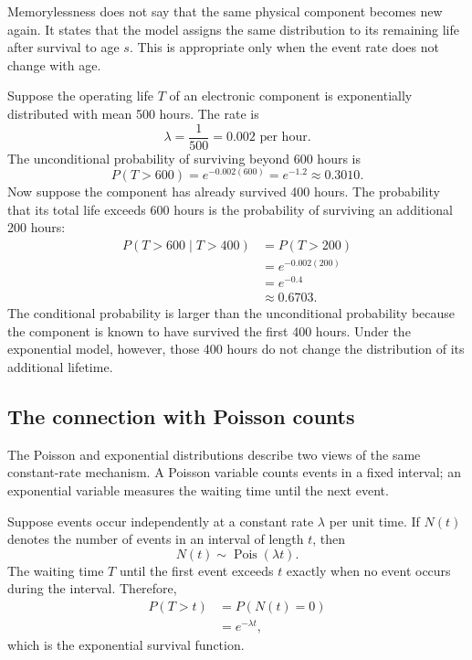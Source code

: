 Memorylessness does not say that the same physical component becomes new again. It states that the model assigns the same distribution to its remaining life after survival to age $s$. This is appropriate only when the event rate does not change with age.

\begin{example}\par
Suppose the operating life $T$ of an electronic component is exponentially distributed with mean 500 hours. The rate is
\[
    \lambda=\frac{1}{500}=0.002\text{ per hour}.
\]
The unconditional probability of surviving beyond 600 hours is
\[
    P(T>600)=e^{-0.002(600)}=e^{-1.2}\approx0.3010.
\]
Now suppose the component has already survived 400 hours. The probability that its total life exceeds 600 hours is the probability of surviving an additional 200 hours:
\[
\begin{aligned}
P(T>600\mid T>400)
  &=P(T>200)\\
  &=e^{-0.002(200)}\\
  &=e^{-0.4}\\
  &\approx0.6703.
\end{aligned}
\]
The conditional probability is larger than the unconditional probability because the component is known to have survived the first 400 hours. Under the exponential model, however, those 400 hours do not change the distribution of its additional lifetime.
\end{example}

\subsection{The connection with Poisson counts}

The Poisson and exponential distributions describe two views of the same constant-rate mechanism. A Poisson variable counts events in a fixed interval; an exponential variable measures the waiting time until the next event.

Suppose events occur independently at a constant rate $\lambda$ per unit time. If $N(t)$ denotes the number of events in an interval of length $t$, then
\[
    N(t)\sim\operatorname{Pois}(\lambda t).
\]
The waiting time $T$ until the first event exceeds $t$ exactly when no event occurs during the interval. Therefore,
\[
\begin{aligned}
P(T>t)
  &=P(N(t)=0)\\
  &=e^{-\lambda t},
\end{aligned}
\]
which is the exponential survival function.

